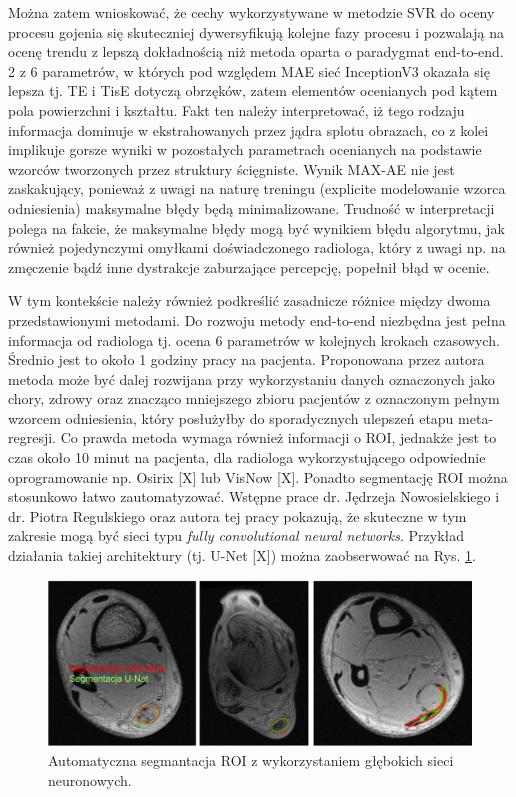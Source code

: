 Można zatem wnioskować, że cechy wykorzystywane w metodzie SVR do oceny procesu gojenia się skuteczniej dywersyfikują kolejne fazy procesu i pozwalają na ocenę trendu z lepszą dokładnością niż metoda oparta o paradygmat end-to-end. 2 z 6 parametrów, w których pod względem MAE sieć InceptionV3 okazała się lepsza tj. TE i TisE dotyczą obrzęków, zatem elementów ocenianych pod kątem pola powierzchni i kształtu. Fakt ten należy interpretować, iż tego rodzaju informacja dominuje w ekstrahowanych przez jądra splotu obrazach, co z kolei implikuje gorsze wyniki w pozostałych parametrach ocenianych na podstawie wzorców tworzonych przez struktury ścięgniste. Wynik MAX-AE nie jest zaskakujący, ponieważ z uwagi na naturę treningu (explicite modelowanie wzorca odniesienia) maksymalne błędy będą minimalizowane. Trudność w interpretacji polega na fakcie, że maksymalne błędy mogą być wynikiem błędu algorytmu, jak również pojedynczymi omyłkami doświadczonego radiologa, który z uwagi np. na zmęczenie bądź inne dystrakcje zaburzające percepcję, popełnił błąd w ocenie.  

W tym kontekście należy również podkreślić zasadnicze różnice między dwoma przedstawionymi metodami. Do rozwoju metody end-to-end niezbędna jest pełna informacja od radiologa tj. ocena 6 parametrów w kolejnych krokach czasowych. Średnio jest to około 1 godziny pracy na pacjenta. Proponowana przez autora metoda może być dalej rozwijana przy wykorzystaniu danych oznaczonych jako chory, zdrowy oraz znacząco mniejszego zbioru pacjentów z oznaczonym pełnym wzorcem odniesienia, który posłużyłby do sporadycznych ulepszeń etapu meta-regresji. Co prawda metoda wymaga również informacji o ROI, jednakże jest to czas około 10 minut na pacjenta, dla radiologa wykorzystującego odpowiednie oprogramowanie np. Osirix [X] lub VisNow [X]. Ponadto segmentację ROI można stosunkowo łatwo zautomatyzować. Wstępne prace dr. Jędrzeja Nowosielskiego i dr. Piotra Regulskiego oraz autora tej pracy pokazują, że skuteczne w tym zakresie mogą być sieci typu \textit{fully convolutional neural networks}. Przykład działania takiej architektury (tj. U-Net [X]) można zaobserwować na Rys. \ref{fig:segmentacja}. 

\begin{figure}[h]
	\centering
	\includegraphics[width=1\textwidth]{figures/Segmentacja.png}
	\caption{Automatyczna segmantacja ROI z wykorzystaniem głębokich sieci neuronowych.}\label{fig:segmentacja}
\end{figure}

